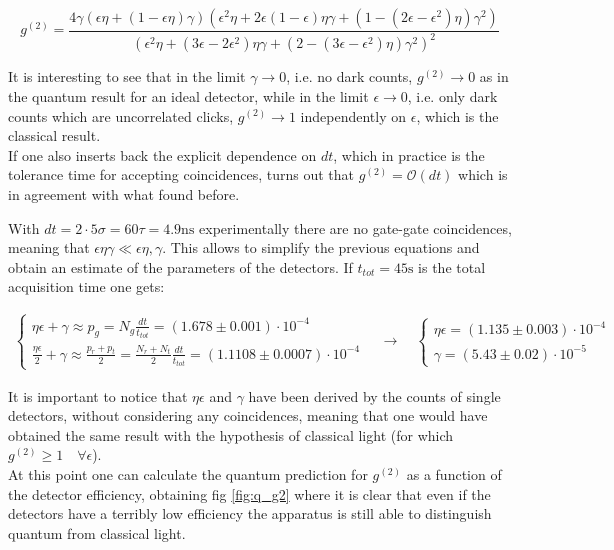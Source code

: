 \documentclass[a4paper, 11pt]{article}
\begin{document}
      \begin{equation*}
        g^{(2)} = \frac{4\gamma\left(\epsilon\eta + (1 - \epsilon\eta)\gamma \right)\left(\epsilon^2\eta + 2\epsilon(1-\epsilon)\eta\gamma + \left(1 - (2\epsilon - \epsilon^2)\eta \right)\gamma^2 \right)}{\left(\epsilon^2\eta + (3\epsilon-2\epsilon^2)\eta\gamma + \left(2 - (3\epsilon - \epsilon^2)\eta \right)\gamma^2 \right)^2}
      \end{equation*}

      It is interesting to see that in the limit $\gamma \rightarrow 0$, i.e. no dark counts, $g^{(2)} \rightarrow 0$ as in the quantum result for an ideal detector, while in the limit $\epsilon \rightarrow 0$, i.e. only dark counts which are uncorrelated clicks, $g^{(2)} \rightarrow 1$ independently on $\epsilon$, which is the classical result.\\
      If one also inserts back the explicit dependence on $dt$, which in practice is the tolerance time for accepting coincidences, turns out that $g^{(2)} = \mathcal{O}(dt)$ which is in agreement with what found before.

      With $dt = 2 \cdot 5\sigma = 60\tau = 4.9 \si{\nano\second}$ experimentally there are no gate-gate coincidences, meaning that $\epsilon\eta\gamma \ll \epsilon\eta,\gamma$.
      This allows to simplify the previous equations and obtain an estimate of the parameters of the detectors. If $t_{tot} = 45 \si{\second}$ is the total acquisition time one gets:

      \begin{gather*}
        \begin{cases}
          \eta\epsilon + \gamma \approx p_g = N_g \frac{dt}{t_{tot}} = (1.678 \pm 0.001) \cdot 10^{-4} \\
          \frac{\eta\epsilon}{2} + \gamma \approx \frac{p_r + p_t}{2} = \frac{N_r + N_t}{2}\frac{dt}{t_{tot}} = (1.1108 \pm 0.0007) \cdot 10^{-4}
        \end{cases}
        \quad \rightarrow \quad
        \begin{cases}
          \eta\epsilon = (1.135 \pm 0.003) \cdot 10^{-4} \\
          \gamma = (5.43 \pm 0.02) \cdot 10^{-5}
        \end{cases}
      \end{gather*}

      It is important to notice that $\eta\epsilon$ and $\gamma$ have been derived by the counts of single detectors, without considering any coincidences, meaning that one would have obtained the same result with the hypothesis of classical light (for which $g^{(2)} \geq 1 \quad \forall \epsilon$).\\
      At this point one can calculate the quantum prediction for $g^{(2)}$ as a function of the detector efficiency, obtaining fig \ref{fig:q_g2} where it is clear that even if the detectors have a terribly low efficiency the apparatus is still able to distinguish quantum from classical light.
\end{document}
